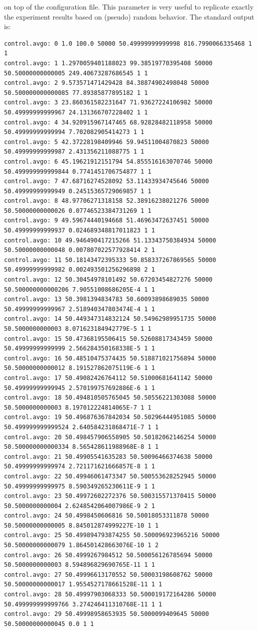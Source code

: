 \documentclass[a4paper,11pt]{article}
\begin{document}
on top of the configuration file. This parameter is very useful to
replicate exactly the experiment results based on (pseudo) random
behavior. The standard output is:

\scriptsize
\begin{verbatim}
control.avgo: 0 1.0 100.0 50000 50.49999999999998 816.7990066335468 1 1
control.avgo: 1 1.2970059401188023 99.38519770395408 50000 50.50000000000005 249.40673287686545 1 1
control.avgo: 2 9.573571471429428 84.38874902498048 50000 50.500000000000085 77.89385877895182 1 1
control.avgo: 3 23.860361582231647 71.93627224106982 50000 50.49999999999967 24.131366707228402 1 1
control.avgo: 4 34.920915967147465 68.92828482118958 50000 50.49999999999994 7.702082905414273 1 1
control.avgo: 5 42.37228198409946 59.94511004870823 50000 50.49999999999987 2.431356211088775 1 1
control.avgo: 6 45.19621912151794 54.855516163070746 50000 50.499999999999844 0.7741451706754877 1 1
control.avgo: 7 47.68716274528092 53.11433934745646 50000 50.49999999999949 0.24515365729069857 1 1
control.avgo: 8 48.97706271318158 52.38916238021276 50000 50.50000000000026 0.07746523384731269 1 1
control.avgo: 9 49.59674440194668 51.46963472637451 50000 50.49999999999937 0.024689348817011823 1 1
control.avgo: 10 49.946490417215266 51.13343750384934 50000 50.50000000000048 0.007807022577928414 2 1
control.avgo: 11 50.18143472395333 50.858337267869565 50000 50.49999999999982 0.002493501256296898 2 1
control.avgo: 12 50.30454978101492 50.67203454827276 50000 50.500000000000206 7.90551008686205E-4 1 1
control.avgo: 13 50.3981394834783 50.60093898689035 50000 50.49999999999967 2.518940347803474E-4 1 1
control.avgo: 14 50.449347314832124 50.54962989951735 50000 50.5000000000003 8.071623184942779E-5 1 1
control.avgo: 15 50.47368195506415 50.52608817343459 50000 50.49999999999999 2.566284350168338E-5 1 1
control.avgo: 16 50.48510475374435 50.518871021756894 50000 50.50000000000012 8.191527862075119E-6 1 1
control.avgo: 17 50.49082426764112 50.51000681641142 50000 50.49999999999945 2.570199757692886E-6 1 1
control.avgo: 18 50.494810505765045 50.50556221303088 50000 50.5000000000003 8.197012224814065E-7 1 1
control.avgo: 19 50.496876367842034 50.50296444951085 50000 50.499999999999524 2.640584231868471E-7 1 1
control.avgo: 20 50.498457906558905 50.50182062146254 50000 50.500000000000334 8.565428611988968E-8 1 1
control.avgo: 21 50.49905541635283 50.50096466374638 50000 50.49999999999974 2.721171621666857E-8 1 1
control.avgo: 22 50.49946061473347 50.500553628252945 50000 50.49999999999975 8.590349265230611E-9 1 1
control.avgo: 23 50.49972602272376 50.500315571370415 50000 50.5000000000004 2.6248542064007986E-9 2 1
control.avgo: 24 50.4998450606816 50.50018053311878 50000 50.50000000000005 8.845012874999227E-10 1 1
control.avgo: 25 50.499894793874255 50.500096923965216 50000 50.50000000000079 1.864501428663076E-10 1 2
control.avgo: 26 50.4999267984512 50.500056126785694 50000 50.5000000000003 8.594896829690765E-11 1 1
control.avgo: 27 50.49996613170552 50.50003198608762 50000 50.50000000000017 1.9554527178661528E-11 1 1
control.avgo: 28 50.49997903068333 50.500019172164286 50000 50.499999999999766 3.274246411310768E-11 1 1
control.avgo: 29 50.49998958653935 50.5000099409645 50000 50.50000000000045 0.0 1 1
\end{verbatim}
\normalsize
\end{document}
